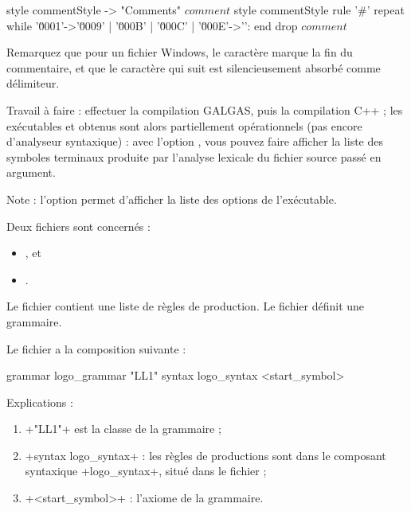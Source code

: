 \begin{galgas}
style commentStyle -> "Comments"
$comment$ style commentStyle %
rule '#' {
  repeat
  while '\u0001'->'\u0009' | '\u000B' | '\u000C' | '\u000E'->'\uFFFD':
  end
  drop $comment$
}
\end{galgas}

Remarquez que pour un fichier Windows, le caractère  marque la fin du commentaire, et que le caractère  qui suit est silencieusement absorbé comme délimiteur.

Travail à faire : effectuer la compilation GALGAS, puis la compilation C++ ; les exécutables  et  obtenus sont alors partiellement opérationnels (pas encore d’analyseur syntaxique) : avec l'option , vous pouvez faire afficher la liste des symboles terminaux produite par l'analyse lexicale du fichier source passé en argument.

Note : l'option  permet d'afficher la liste des options de l'exécutable. 


Deux fichiers sont concernés :
\begin{itemize}
  \item {}, et
  \item {}.
\end{itemize}

Le fichier  contient une liste de règles de production. Le fichier  définit une grammaire.

Le fichier  a la composition suivante :

\begin{galgas}
grammar logo_grammar "LL1" {
  syntax logo_syntax
  <start_symbol>
}
\end{galgas}

Explications :
\begin{enumerate}
  \item \ggs+"LL1"+ est la classe de la grammaire ;
  \item \ggs+syntax logo_syntax+ : les règles de productions sont dans le composant syntaxique \ggs+logo_syntax+, situé dans le fichier  ; 
  \item \ggs+<start_symbol>+ : l'axiome de la grammaire.
\end{enumerate}

